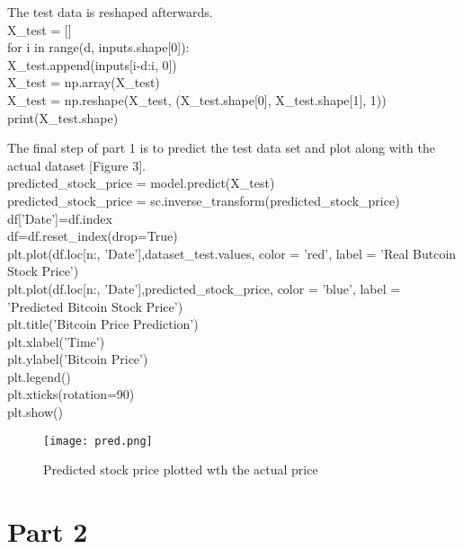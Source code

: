 \documentclass[11pt]{diazessay} %
\begin{document}
The test data is reshaped afterwards.\\

{\selectfont
\noindent X\_test = []\\
for i in range(d, inputs.shape[0]):\\
    X\_test.append(inputs[i-d:i, 0])\\
X\_test = np.array(X\_test)\\
X\_test = np.reshape(X\_test, (X\_test.shape[0], X\_test.shape[1], 1))\\
print(X\_test.shape)\\
}

The final step of part 1 is to predict the test data set and plot along with the actual dataset [Figure 3].\\

{\selectfont
\noindent predicted\_stock\_price = model.predict(X\_test)\\
predicted\_stock\_price = sc.inverse\_transform(predicted\_stock\_price)\\
df['Date']=df.index\\
df=df.reset\_index(drop=True)\\
plt.plot(df.loc[n:, 'Date'],dataset\_test.values, color = 'red', label = 'Real Butcoin Stock Price')\\
plt.plot(df.loc[n:, 'Date'],predicted\_stock\_price, color = 'blue', label = 'Predicted Bitcoin Stock Price')\\
plt.title('Bitcoin Price Prediction')\\
plt.xlabel('Time')\\
plt.ylabel('Bitcoin Price')\\
plt.legend()\\
plt.xticks(rotation=90)\\
plt.show()\\
}

\begin{figure}[!h]
\begin{center}
\texttt{[image: pred.png]} %
\caption{Predicted stock price plotted wth the actual price}
\end{center}
\end{figure}

\section*{Part 2}
\end{document}
